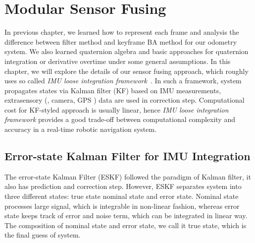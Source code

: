 \chapter{Modular Sensor Fusing}
\label{chap:sensor_fusing}

In previous chapter, we learned how to represent each frame and analysis the difference between filter method and keyframe BA method for our odometry system. We also learned quaternion algebra and basic approaches for quaternion integration or derivative overtime under some general assumptions. In this chapter, we will explore the details of our sensor fusing approach, which roughly uses so called \textit{IMU loose integration framework}~\cite{weiss2012vision}. In such a framework, system propagates states via Kalman filter (KF) based on IMU measurements, extrasensory (\eg, camera, GPS \etc) data are used in correction step. Computational cost for KF-styled approach is usually linear, hence \textit{IMU loose integration framework} provides a good trade-off between computational complexity and accuracy in a real-time robotic navigation system.

\section{Error-state Kalman Filter for IMU Integration}
\label{sec:ESKF_IMU}

The error-state Kalman Filter (ESKF) followed the paradigm of Kalman filter, it also has prediction and correction step. However, ESKF separates system into three different states: true state nominal state and error state. Nominal state processes large signal, which is integrable in non-linear fashion, whereas error state
keeps track of error and noise term, which can be integrated in linear way. The composition of nominal state and error state, we call it true state, which is the final guess of system.


